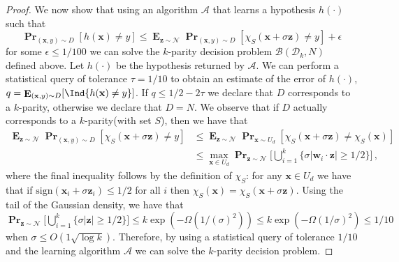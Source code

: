\documentclass[10pt,a4paper]{article}
\renewcommand\vec[1]{\mathbf{#1}}
\DeclareMathOperator*{\pr}{\mathbf{Pr}}
\DeclareMathOperator*{\E}{\mathbf{E}}
\newcommand{\normal}{\mathcal{N}}
\newcommand{\sign}{\mathrm{sign}}
\newcommand{\1}{\Ind}
\newcommand{\x}{\vec x}
\newcommand{\z}{\vec z}
\begin{document}
\begin{proof}
We now show that using an algorithm $\mathcal{A}$ that 
learns a hypothesis $h(\cdot)$ such that %
\[\pr_{(\x, y) \sim D}[ h( \x) \neq y] \leq 
\E_{\z \sim \normal} \pr_{(\x, y) \sim D}[  \chi_S(\x+\sigma \z) \neq y] + \epsilon\] for some $\epsilon \leq 1/100$ we can solve the $k$-parity decision problem $\mathcal{B}(\mathcal D_k, N)$ defined above.  Let $h(\cdot)$ be the hypothesis returned 
by $\mathcal A$.   We can perform a statistical query
of tolerance $\tau = 1/10$ to obtain an estimate of the
error of $h(\cdot)$, $q = \E_{( \x, y) \sim D}[\1\{h(\x) \neq y\}]$.  If $q \leq 1/2 - 2\tau$ we declare that $D$ corresponds to a $k$-parity, otherwise we declare 
that $D = N$.  We observe that if $D$ actually corresponds to a $k$-parity(with set $S$), then we have that 
\begin{align*}
\E_{\z \sim \normal} \pr_{(\x, y) \sim D}[ \chi_S(\x
+ \sigma  \vec z ) \neq y]
&\leq 
\E_{\z \sim \normal} \pr_{\x \sim U_d}[ \chi_S(\x+\sigma\z)\neq \chi_S(\x) ]
\\
&\leq \max_{\x \in U_d}
\pr_{\z \sim \normal} \Big[ \bigcup_{i=1}^k \Big\{ \sigma |\vec w_i \cdot \vec z| \geq 1/2 \Big\} \Big ] \,,
\end{align*}
where the final inequality follows by the definition of $\chi_S$: for any  $\x \in U_d$ we have that if $\sign(\x_i+\sigma \z_i)\leq 1/2 $ for all $i$ then $\chi_S(\x)=\chi_S(\x+\sigma \z)$.
Using the tail of the Gaussian density, we have that
$
\pr_{\z \sim \normal} \Big[ \bigcup_{i=1}^k \Big\{ \sigma |\vec z| \geq 1/2 \Big\} \Big ]
\leq k \exp(-\Omega(1/(\sigma)^2 ))
\leq k \exp(-\Omega(1/\sigma)^2 )
\leq 1/10$ when $\sigma\leq O(1\sqrt{\log k})$. Therefore, by using a statistical query of tolerance $1/10$ and the learning algorithm $\mathcal{A}$ we can solve the $k$-parity decision problem.  
\end{proof}
\end{document}
